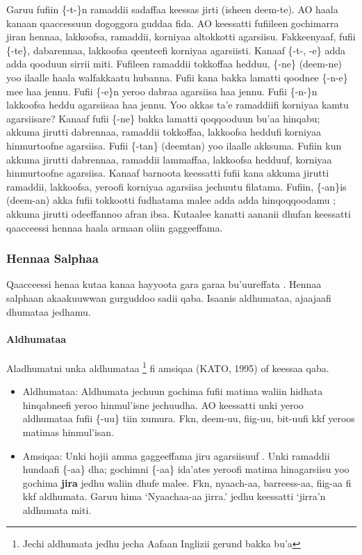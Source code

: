 \documentclass[11pt,b5paper]{book}
\begin{document}
Garuu fufiin \{-t-\}n ramaddii sadaffaa keessas jirti (isheen deem-te). AO haala kanaan qaaccessuun dogoggora guddaa fida. AO keessatti fufiileen gochimarra jiran hennaa, lakkoofsa, ramaddii, korniyaa altokkotti agarsiisu.
Fakkeenyaaf, fufii \{-te\}, dabarennaa, lakkoofsa qeenteefi korniyaa agarsiisti. Kanaaf \{-t-, -e\} adda adda qooduun sirrii miti. Fufileen ramaddii tokkoffaa hedduu, \{-ne\} (deem-ne) yoo ilaalle haala walfakkaatu hubanna. Fufii kana bakka lamatti qoodnee \{-n-e\} mee haa jennu. Fufii \{-e\}n yeroo dabraa agarsiisa haa jennu. Fufii \{-n-\}n lakkoofsa heddu agarsiisaa haa jennu. Yoo akkas ta’e ramaddiifi korniyaa kamtu agarsiisare? Kanaaf fufii \{-ne\} bakka lamatti qoqqooduun bu’aa hinqabu; akkuma jirutti dabrennaa, ramaddii tokkoffaa, lakkoofsa heddufi korniyaa hinmurtoofne agarsiisa. Fufii \{-tan\} (deemtan) yoo ilaalle akksuma. Fufiin kun akkuma jirutti dabrennaa, ramaddii lammaffaa, lakkoofsa hedduuf, korniyaa hinmurtoofne agarsiisa.  Kanaaf barnoota keessatti fufii kana akkuma jirutti ramaddii, lakkoofsa, yeroofi korniyaa agarsiisa jechuutu filatama. Fufiin, \{-an\}is (deem-an) akka fufii tokkootti fudhatama malee adda adda hinqoqqoodamu ; akkuma jirutti odeeffannoo afran ibsa. Kutaalee kanatti aananii dhufan keessatti qaacceessi hennaa haala armaan oliin gaggeeffama. 

\subsubsection{Hennaa Salphaa}

Qaacceessi henaa kutaa kanaa hayyoota gara garaa bu'uureffata \cite{aadaa1995,griefenow2001grammatical,owens1985grammar,tolemariam2011}. Hennaa salphaan akaakuuwwan gurguddoo sadii qaba. Isaanis aldhumataa, ajaajaafi dhumataa jedhamu. 

\paragraph{Aldhumataa}
Aladhumatni unka aldhumataa \footnote{Jechi aldhumata jedhu jecha Aafaan Inglizii gerund bakka bu'a} fi amsiqaa (KATO, 1995) of keessaa qaba. 
\begin{itemize}
	\item Aldhumataa: Aldhumata jechuun gochima fufii matima waliin hidhata hinqabneefi yeroo hinmul’isne jechuudha. AO keessatti unki yeroo aldhumataa fufii \{-uu\} tiin xumura. Fkn, deem-uu, fiig-uu, bit-uufi kkf yeroos matimas hinmul’isan.
	\item Amsiqaa: Unki hojii amma gaggeeffama jiru agarsiisuuf . Unki ramaddii hundaafi \{-aa\} dha; gochimni \{-aa\} ida’ates yeroofi matima hinagarsiisu yoo gochima \textbf{jira} jedhu waliin dhufe malee. Fkn, nyaach-aa, barreess-aa, fiig-aa fi kkf aldhumata. Garuu hima ‘Nyaachaa-aa jirra.’ jedhu keessatti ‘jirra’n aldhumata miti.
\end{itemize}
\end{document}

